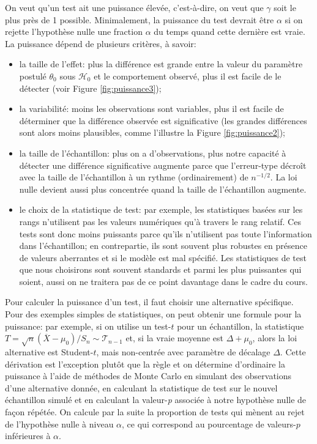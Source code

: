 \documentclass[
  11pt,
  letterpaper,
]{article}
\providecommand{\tightlist}{%
  \setlength{\itemsep}{0pt}\setlength{\parskip}{0pt}}
\theoremstyle{definition}
\theoremstyle{definition}
\theoremstyle{definition}
\theoremstyle{definition}
\theoremstyle{remark}
\begin{document}
On veut qu'un test ait une puissance élevée, c'est-à-dire, on veut que \(\gamma\) soit le plus près de 1 possible. Minimalement, la puissance du test devrait être \(\alpha\) si on rejette l'hypothèse nulle une fraction \(\alpha\) du temps quand cette dernière est vraie. La puissance dépend de plusieurs critères, à savoir:

\begin{itemize}
\tightlist
\item
  la taille de l'effet: plus la différence est grande entre la valeur du paramètre postulé \(\theta_0\) sous \(\mathscr{H}_0\) et le comportement observé, plus il est facile de le détecter (voir Figure \ref{fig:puissance3});
\item
  la variabilité: moins les observations sont variables, plus il est facile de déterminer que la différence observée est significative (les grandes différences sont alors moins plausibles, comme l'illustre la Figure \ref{fig:puissance2});
\item
  la taille de l'échantillon: plus on a d'observations, plus notre capacité à détecter une différence significative augmente parce que l'erreur-type décroît avec la taille de l'échantillon à un rythme (ordinairement) de \(n^{-1/2}\). La loi nulle devient aussi plus concentrée quand la taille de l'échantillon augmente.
\item
  le choix de la statistique de test: par exemple, les statistiques basées sur les rangs n'utilisent pas les valeurs numériques qu'à travers le rang relatif. Ces tests sont donc moins puissants parce qu'ils n'utilisent pas toute l'information dans l'échantillon; en contrepartie, ils sont souvent plus robustes en présence de valeurs aberrantes et si le modèle est mal spécifié. Les statistiques de test que nous choisirons sont souvent standards et parmi les plus puissantes qui soient, aussi on ne traitera pas de ce point davantage dans le cadre du cours.
\end{itemize}

Pour calculer la puissance d'un test, il faut choisir une alternative spécifique. Pour des exemples simples de statistiques, on peut obtenir une formule pour la puissance: par exemple, si on utilise un test-\(t\) pour un échantillon, la statistique \(T=\sqrt{n}(\overline{X}-\mu_0)/S_n \sim \mathcal{T}_{n-1}\) et, si la vraie moyenne est \(\Delta + \mu_0\), alors la loi alternative est Student-\(t\), mais non-centrée avec paramètre de décalage \(\Delta\). Cette dérivation est l'exception plutôt que la règle et on détermine d'ordinaire la puissance à l'aide de méthodes de Monte Carlo en simulant des observations d'une alternative donnée, en calculant la statistique de test sur le nouvel échantillon simulé et en calculant la valeur-\emph{p} associée à notre hypothèse nulle de façon répétée. On calcule par la suite la proportion de tests qui mènent au rejet de l'hypothèse nulle à niveau \(\alpha\), ce qui correspond au pourcentage de valeurs-\(p\) inférieures à \(\alpha\).
\end{document}
